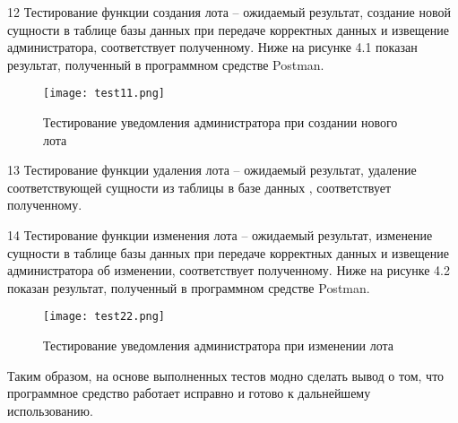 12 Тестирование функции создания лота – ожидаемый результат, создание новой сущности в таблице базы данных 
при передаче корректных данных и извещение администратора, соответствует полученному.
Ниже на рисунке 4.1 показан результат, полученный в программном средстве Postman.
\begin{figure}[h]
\centering
\texttt{[image: test11.png]}
\caption{Тестирование уведомления администратора при создании нового лота}
\end{figure}

13 Тестирование функции удаления лота – ожидаемый результат, удаление соответствующей сущности из таблицы в базе данных , соответствует полученному.

14 Тестирование функции изменения лота – ожидаемый результат, изменение сущности в таблице базы данных при 
передаче корректных данных и извещение администратора об изменении, соответствует полученному.
Ниже на рисунке 4.2 показан результат, полученный в программном средстве Postman.
\begin{figure}[h]
\centering
\texttt{[image: test22.png]}
\caption{Тестирование уведомления администратора при изменении лота}
\end{figure}


Таким образом, на основе выполненных тестов модно сделать вывод о том, 
что программное средство работает исправно и готово к дальнейшему использованию.